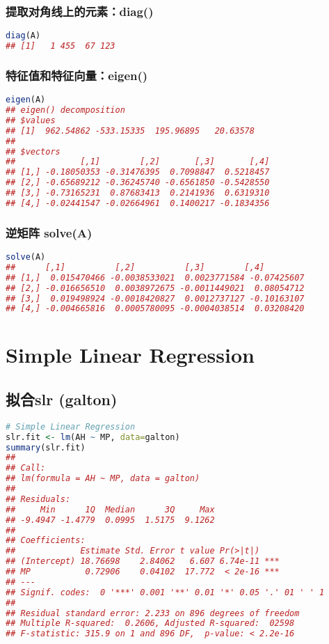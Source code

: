 \documentclass[11pt,a4paper]{article}
\begin{document}
\subsubsection{提取对角线上的元素：diag()}
\begin{lstlisting}[language=R]
diag(A)
## [1]   1 455  67 123
\end{lstlisting}
\subsubsection{特征值和特征向量：eigen()}
\begin{lstlisting}[language=R]
eigen(A)
## eigen() decomposition
## $values
## [1]  962.54862 -533.15335  195.96895   20.63578
## 
## $vectors
##             [,1]        [,2]       [,3]       [,4]
## [1,] -0.18050353 -0.31476395  0.7098847  0.5218457
## [2,] -0.65689212 -0.36245740 -0.6561850 -0.5428550
## [3,] -0.73165231  0.87683413  0.2141936  0.6319310
## [4,] -0.02441547 -0.02664961  0.1400217 -0.1834356
\end{lstlisting}

\subsubsection{逆矩阵 solve(A)}
\begin{lstlisting}[language=R]
solve(A)
##      [,1]          [,2]          [,3]        [,4]
## [1,]  0.015470466 -0.0038533021  0.0023771584 -0.07425607
## [2,] -0.016656510  0.0038972675 -0.0011449021  0.08054712
## [3,]  0.019498924 -0.0018420827  0.0012737127 -0.10163107
## [4,] -0.004665816  0.0005780095 -0.0004038514  0.03208420
\end{lstlisting}




\section{Simple Linear Regression}
\subsection{拟合slr (galton)}
\begin{lstlisting}[language=R]
# Simple Linear Regression
slr.fit <- lm(AH ~ MP, data=galton)
summary(slr.fit)
## 
## Call:
## lm(formula = AH ~ MP, data = galton)
## 
## Residuals:
##     Min      1Q  Median      3Q     Max 
## -9.4947 -1.4779  0.0995  1.5175  9.1262 
## 
## Coefficients:
##             Estimate Std. Error t value Pr(>|t|)    
## (Intercept) 18.76698    2.84062   6.607 6.74e-11 ***
## MP           0.72906    0.04102  17.772  < 2e-16 ***
## ---
## Signif. codes:  0 '***' 0.001 '**' 0.01 '*' 0.05 '.' 01 ' ' 1
## 
## Residual standard error: 2.233 on 896 degrees of freedom
## Multiple R-squared:  0.2606, Adjusted R-squared:  02598 
## F-statistic: 315.9 on 1 and 896 DF,  p-value: < 2.2e-16
\end{lstlisting}
\end{document}
